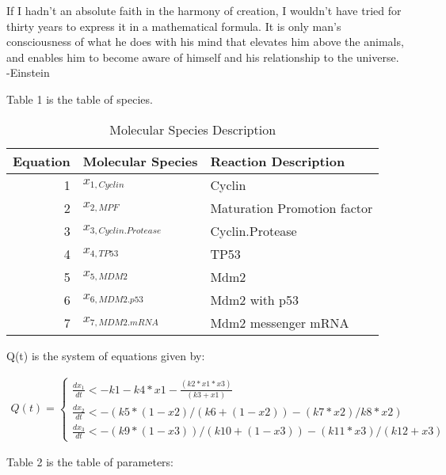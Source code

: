 \documentclass[preprint, 12pt]{elsarticle}
\theoremstyle{definition}
\begin{document}
	
If I hadn't an absolute faith in the harmony of creation, I wouldn't have tried for thirty years to express it in a mathematical formula. It is only man's consciousness of what he does with his mind that elevates him above the animals, and enables him to become aware of himself and his relationship to the universe. -Einstein \cite{key1}

Table 1 is the table of species. \cite{key2}
\begin{table}[H]
	\centering
	\begin{tabular}{rll}
		\hline
		Equation & Molecular Species & Reaction Description\\ 
		\hline
		1 & $x_{1,Cyclin}$  & Cyclin \\ 
		2 & $x_{2,MPF}$  & Maturation Promotion factor\\ 
		3 & $x_{3,Cyclin.Protease}$  & Cyclin.Protease \\ 
		4 & $x_{4,TP53}$ & TP53 \\ 
		5 & $x_{5,MDM2}$  & Mdm2 \\ 
		6 & $x_{6,MDM2.p53}$  & Mdm2 with p53 \\ 
		7 & $x_{7,MDM2.mRNA}$  & Mdm2 messenger mRNA \\ 
		\hline
	\end{tabular}
	\caption{Molecular Species Description}
\end{table}

Q(t) is the system of equations given by:
	
\begin{align}
	Q(t)=\begin{cases}
	\frac{dx_1}{dt}<-k1-k4*x1-\frac{(k2*x1*x3)}{(k3+x1)} \\
	\frac{dx_2}{dt}<-(k5*(1-x2)/(k6+(1-x2)) - (k7*x2)/k8*x2) \\
	\frac{dx_3}{dt}<-(k9*(1-x3))/(k10+(1-x3)) - (k11*x3)/(k12+x3) 
	\end{cases}
	\label{EquationSystem1}
	\end{align}

Table 2 is the table of parameters:
\end{document}
